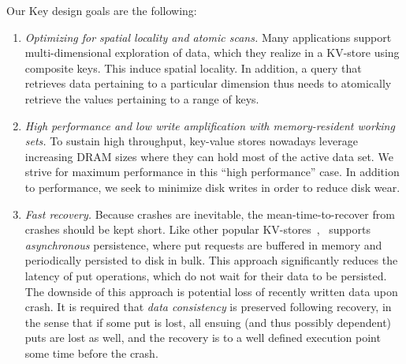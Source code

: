 Our Key design goals are the following:
\begin{enumerate}\itemsep0pt
\item \emph{Optimizing for spatial locality and atomic scans.}
 Many applications support multi-dimensional exploration of data, 
 which they realize in a KV-store using composite keys. This induce spatial locality.  
In addition, a query that retrieves data pertaining to a particular dimension thus needs to atomically 
retrieve the values pertaining to a range of keys. 
 

\item \emph{High performance and low write amplification with memory-resident working sets.}
To sustain high throughput, key-value stores nowadays leverage increasing DRAM sizes where they can hold most of the 
active data set. We strive for maximum performance in this ``high performance'' case.  
In addition to performance, we seek to minimize disk writes in order to reduce disk wear.

\item \emph{Fast recovery.}
Because crashes are inevitable, the mean-time-to-recover from crashes should be kept short.
Like other popular KV-stores~\cite{RocksDB,leveldb,hbase}, \sys\ supports \emph{asynchronous} persistence, 
where put requests are buffered in memory and periodically persisted to disk in bulk. 
This approach significantly reduces the latency of put operations, which do not wait for their data to be persisted.
The downside of this approach is potential loss of recently written data upon crash. 
It is required that \emph{data consistency} is preserved following recovery, in the sense that 
if some put is lost, all ensuing (and thus possibly dependent) puts are lost as well, and the recovery is to a well 
defined execution point some time before the crash.
 
\end{enumerate}


